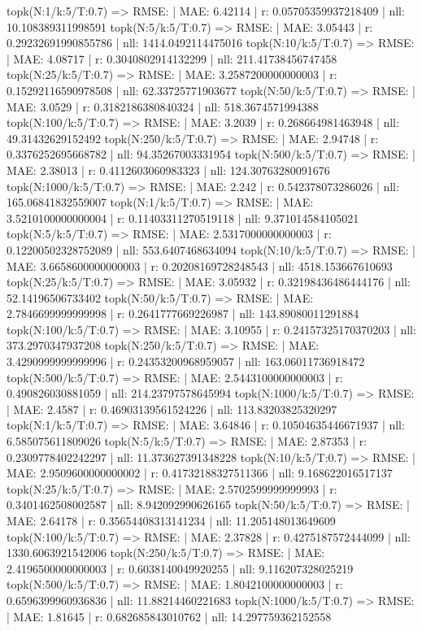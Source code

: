 topk(N:1/k:5/T:0.7) => RMSE: | MAE: 6.42114 | r: 0.05705359937218409 | nll: 10.108389311998591
topk(N:5/k:5/T:0.7) => RMSE: | MAE: 3.05443 | r: 0.29232691990855786 | nll: 1414.0492114475016
topk(N:10/k:5/T:0.7) => RMSE: | MAE: 4.08717 | r: 0.3040802914132299 | nll: 211.41738456747458
topk(N:25/k:5/T:0.7) => RMSE: | MAE: 3.2587200000000003 | r: 0.15292116590978508 | nll: 62.33725771903677
topk(N:50/k:5/T:0.7) => RMSE: | MAE: 3.0529 | r: 0.3182186380840324 | nll: 518.3674571994388
topk(N:100/k:5/T:0.7) => RMSE: | MAE: 3.2039 | r: 0.268664981463948 | nll: 49.31432629152492
topk(N:250/k:5/T:0.7) => RMSE: | MAE: 2.94748 | r: 0.3376252695668782 | nll: 94.35267003331954
topk(N:500/k:5/T:0.7) => RMSE: | MAE: 2.38013 | r: 0.4112603060983323 | nll: 124.30763280091676
topk(N:1000/k:5/T:0.7) => RMSE: | MAE: 2.242 | r: 0.542378073286026 | nll: 165.06841832559007
topk(N:1/k:5/T:0.7) => RMSE: | MAE: 3.5210100000000004 | r: 0.11403311270519118 | nll: 9.371014584105021
topk(N:5/k:5/T:0.7) => RMSE: | MAE: 2.5317000000000003 | r: 0.12200502328752089 | nll: 553.6407468634094
topk(N:10/k:5/T:0.7) => RMSE: | MAE: 3.6658600000000003 | r: 0.20208169728248543 | nll: 4518.153667610693
topk(N:25/k:5/T:0.7) => RMSE: | MAE: 3.05932 | r: 0.32198436486444176 | nll: 52.14196506733402
topk(N:50/k:5/T:0.7) => RMSE: | MAE: 2.7846699999999998 | r: 0.2641777669226987 | nll: 143.89080011291884
topk(N:100/k:5/T:0.7) => RMSE: | MAE: 3.10955 | r: 0.24157325170370203 | nll: 373.2970347937208
topk(N:250/k:5/T:0.7) => RMSE: | MAE: 3.4290999999999996 | r: 0.24353200968959057 | nll: 163.06011736918472
topk(N:500/k:5/T:0.7) => RMSE: | MAE: 2.5443100000000003 | r: 0.490826030881059 | nll: 214.23797578645994
topk(N:1000/k:5/T:0.7) => RMSE: | MAE: 2.4587 | r: 0.46903139561524226 | nll: 113.83203825320297
topk(N:1/k:5/T:0.7) => RMSE: | MAE: 3.64846 | r: 0.10504635446671937 | nll: 6.585075611809026
topk(N:5/k:5/T:0.7) => RMSE: | MAE: 2.87353 | r: 0.2309778402242297 | nll: 11.373627391348228
topk(N:10/k:5/T:0.7) => RMSE: | MAE: 2.9509600000000002 | r: 0.41732188327511366 | nll: 9.168622016517137
topk(N:25/k:5/T:0.7) => RMSE: | MAE: 2.5702599999999993 | r: 0.3401462508002587 | nll: 8.942092990626165
topk(N:50/k:5/T:0.7) => RMSE: | MAE: 2.64178 | r: 0.35654408313141234 | nll: 11.205148013649609
topk(N:100/k:5/T:0.7) => RMSE: | MAE: 2.37828 | r: 0.4275187572444099 | nll: 1330.6063921542006
topk(N:250/k:5/T:0.7) => RMSE: | MAE: 2.4196500000000003 | r: 0.6038140049920255 | nll: 9.116207328025219
topk(N:500/k:5/T:0.7) => RMSE: | MAE: 1.8042100000000003 | r: 0.6596399960936836 | nll: 11.88214460221683
topk(N:1000/k:5/T:0.7) => RMSE: | MAE: 1.81645 | r: 0.682685843010762 | nll: 14.297759362152558
